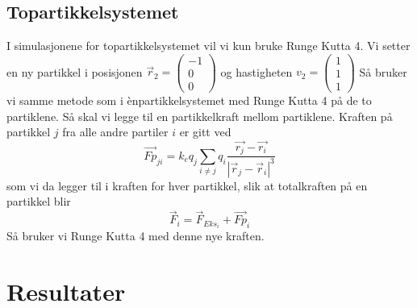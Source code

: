 \documentclass[reprint,english,notitlepage]{revtex4-1}  %
\begin{document}
\subsection*{Topartikkelsystemet}
I simulasjonene for topartikkelsystemet vil vi kun bruke Runge Kutta 4. Vi setter en ny partikkel i posisjonen $\vec{r}_2=\begin{pmatrix}
-1\\0\\0
\end{pmatrix}
$ og hastigheten $v_2=\begin{pmatrix}
1\\1\\1
\end{pmatrix}$
Så bruker vi samme metode som i ènpartikkelsystemet med Runge Kutta 4 på de to partiklene.
\newline  Så skal vi legge til en partikkelkraft mellom partiklene. Kraften på partikkel $j$ fra alle andre partiler $i$ er gitt ved
$$
\vec{Fp}_{ji}=k_e q_j \sum_{i\neq j} q_i \frac{\vec{r_j}-\vec{r_i}}{|\vec{r}_j-\vec{r}_i|^3}
$$
som vi da legger til i kraften for hver partikkel, slik at totalkraften på en partikkel blir
$$
\vec{F}_i=\vec{F}_{Eks_i}+\vec{Fp}_i
$$
Så bruker vi Runge Kutta 4 med denne nye kraften.
\section{Resultater}
\end{document}
